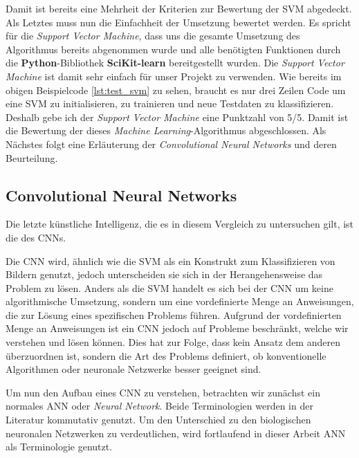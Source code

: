 Damit ist bereits eine Mehrheit der Kriterien zur Bewertung der SVM abgedeckt. Als Letztes muss nun die Einfachheit der Umsetzung bewertet werden.
Es spricht für die \textit{Support Vector Machine}, dass uns die gesamte Umsetzung des Algorithmus bereits abgenommen wurde und alle benötigten
Funktionen durch die \textbf{Python}-Bibliothek \textbf{SciKit-learn} bereitgestellt wurden. Die \textit{Support Vector Machine} ist damit sehr einfach
für unser Projekt zu verwenden.  Wie bereits im obigen Beispielcode \ref{lst:test_svm} zu sehen, braucht es nur drei Zeilen Code um eine SVM zu initialisieren,
zu trainieren und neue Testdaten zu klassifizieren. Deshalb gebe ich der \textit{Support Vector Machine} eine Punktzahl von 5/5.
Damit ist die Bewertung der dieses \textit{Machine Learning}-Algorithmus abgeschlossen. 
Als Nächstes folgt eine Erläuterung der \textit{Convolutional Neural Networks} und deren Beurteilung.

\newpage

\subsection{Convolutional Neural Networks} \label{ssec:cnn}
Die letzte künstliche Intelligenz, die es in diesem Vergleich zu untersuchen gilt, ist die des \acp{CNN}.

Die CNN wird, ähnlich wie die SVM als ein Konstrukt zum Klassifizieren von Bildern genutzt, jedoch unterscheiden sie sich in der Herangehensweise das Problem zu lösen. Anders als die SVM handelt es sich bei der CNN um keine algorithmische Umsetzung, sondern um eine vordefinierte Menge an Anweisungen, die zur Lösung eines spezifischen Problems führen. Aufgrund der vordefinierten Menge an Anweisungen ist ein CNN jedoch auf Probleme beschränkt, welche wir verstehen und lösen können. Dies hat zur Folge, dass kein Ansatz dem anderen überzuordnen ist, sondern die Art des Problems definiert, ob konventionelle Algorithmen oder neuronale Netzwerke besser geeignet sind. \cite*{10.1007/978-3-319-45378-1_1}

Um nun den Aufbau eines CNN zu verstehen, betrachten wir zunächst ein normales \ac{ANN} oder \textit{Neural Network}. Beide Terminologien werden in der Literatur kommutativ genutzt. Um den Unterschied zu den biologischen neuronalen Netzwerken zu verdeutlichen, wird fortlaufend in dieser Arbeit ANN als Terminologie genutzt.

